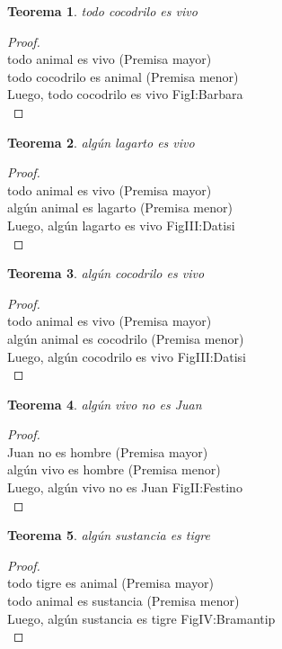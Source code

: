 ﻿\documentclass[12pt]{book}
\newtheorem{theorem}{Teorema}[chapter]
\newtheorem{proof}{Demostración}
\begin{document}
\begin{theorem}
todo cocodrilo es vivo
\label{th: 52}
\end{theorem}\begin{proof}\\todo animal es vivo	 (Premisa mayor) \\todo cocodrilo es animal	 (Premisa menor) \\Luego, todo cocodrilo es vivo	FigI:Barbara \\ \end{proof}
\begin{theorem}
algún lagarto es vivo
\label{th: 53}
\end{theorem}\begin{proof}\\todo animal es vivo	 (Premisa mayor) \\algún animal es lagarto	 (Premisa menor) \\Luego, algún lagarto es vivo	FigIII:Datisi \\ \end{proof}
\begin{theorem}
algún cocodrilo es vivo
\label{th: 54}
\end{theorem}\begin{proof}\\todo animal es vivo	 (Premisa mayor) \\algún animal es cocodrilo	 (Premisa menor) \\Luego, algún cocodrilo es vivo	FigIII:Datisi \\ \end{proof}
\begin{theorem}
algún vivo no es Juan
\label{th: 55}
\end{theorem}\begin{proof}\\Juan no es hombre	 (Premisa mayor) \\algún vivo es hombre	 (Premisa menor) \\Luego, algún vivo no es Juan	FigII:Festino \\ \end{proof}
\begin{theorem}
algún sustancia es tigre
\label{th: 56}
\end{theorem}\begin{proof}\\todo tigre es animal	 (Premisa mayor) \\todo animal es sustancia	 (Premisa menor) \\Luego, algún sustancia es tigre	FigIV:Bramantip \\ \end{proof}
\end{document}

